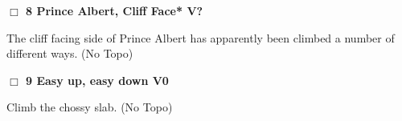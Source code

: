 \begin{multicols}{2}
\needspace{2em}
\label{rt:PA 2}
\colorbox{black!20}{
\parbox{0.95\linewidth}{
\hspace{-1ex}\textbf{$\Box$
8 Prince Albert, Cliff Face* V?  
}}}
\begin{adjustwidth}{1.3em}{}			

The cliff facing side of Prince Albert has apparently been climbed a number of different ways.
  (No Topo)
\end{adjustwidth}




\needspace{2em}
\label{rt:Easy up, easy down}
\colorbox{green!20}{
\parbox{0.95\linewidth}{
\hspace{-1ex}\textbf{$\Box$
9 Easy up, easy down V0  \warn\warn
}}}
\begin{adjustwidth}{1.3em}{}			

Climb the chossy slab.
  (No Topo)
\end{adjustwidth}






\end{multicols}
\clearpage